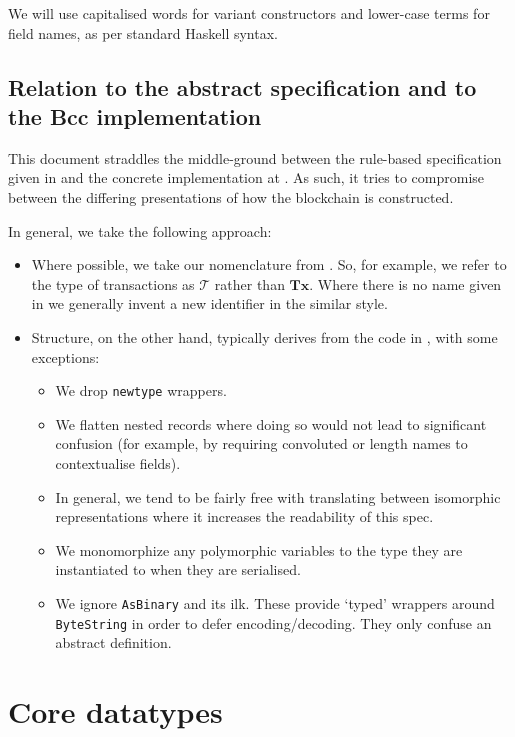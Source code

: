 \documentclass{article}
\newcommand{\txs}{\mathcal{T}}
\begin{document}
We will use capitalised words for variant constructors and lower-case
terms for field names, as per standard Haskell syntax.

\subsection{Relation to the abstract specification and to the Bcc implementation}

This document straddles the middle-ground between the rule-based specification
given in \cite{spiwack} and the concrete implementation at \cite{bcc}. As
such, it tries to compromise between the differing presentations of how the
blockchain is constructed.

In general, we take the following approach:

\begin{itemize}
\item Where possible, we take our nomenclature from \cite{spiwack}. So, for
  example, we refer to the type of transactions as $\txs$ rather than
  $\textbf{Tx}$. Where there is no name given in \cite{spiwack} we generally
  invent a new identifier in the similar style.
\item Structure, on the other hand, typically derives from the code in
  \cite{bcc}, with some exceptions:
  \begin{itemize}
  \item We drop \verb|newtype| wrappers.
  \item We flatten nested records where doing so would not lead to significant
    confusion (for example, by requiring convoluted or length names to
    contextualise fields).
  \item In general, we tend to be fairly free with translating between
    isomorphic representations where it increases the readability of this spec.
  \item We monomorphize any polymorphic variables to the type they are
    instantiated to when they are serialised.
  \item We ignore \verb|AsBinary| and its ilk. These provide `typed' wrappers
    around \verb|ByteString| in order to defer encoding/decoding. They only
    confuse an abstract definition.
  \end{itemize}
\end{itemize}

\section{Core datatypes}
\label{sec:types}
\end{document}
